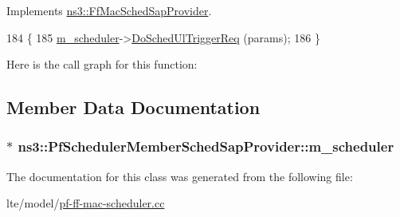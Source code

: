 Implements \hyperlink{classns3_1_1FfMacSchedSapProvider_a7bd978ea17a587a1626ef684be006c04}{ns3\+::\+Ff\+Mac\+Sched\+Sap\+Provider}.


\begin{DoxyCode}
184 \{
185   \hyperlink{classns3_1_1PfSchedulerMemberSchedSapProvider_a17ea9e08661e70cd07b9eb9980671a79}{m\_scheduler}->\hyperlink{classns3_1_1PfFfMacScheduler_a31f30c23ae2d06b51dc81f24cb397e4b}{DoSchedUlTriggerReq} (params);
186 \}
\end{DoxyCode}


Here is the call graph for this function\+:




\subsection{Member Data Documentation}
\subsubsection[{\texorpdfstring{m\+\_\+scheduler}{m_scheduler}}]{ $\ast$ ns3\+::\+Pf\+Scheduler\+Member\+Sched\+Sap\+Provider\+::m\+\_\+scheduler\hspace{0.3cm}{\ttfamily [private]}}\hypertarget{classns3_1_1PfSchedulerMemberSchedSapProvider_a17ea9e08661e70cd07b9eb9980671a79}{}\label{classns3_1_1PfSchedulerMemberSchedSapProvider_a17ea9e08661e70cd07b9eb9980671a79}


The documentation for this class was generated from the following file\+:\begin{DoxyCompactItemize}
\item 
lte/model/\hyperlink{lte_2model_2pf-ff-mac-scheduler_8cc}{pf-\/ff-\/mac-\/scheduler.\+cc}\end{DoxyCompactItemize}

